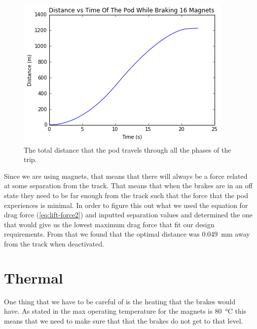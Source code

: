 \documentclass[main.tex]{subfiles}
\begin{document}
    \begin{figure}
        \centering
        \includegraphics[width=\linewidth]{images/totaldistanceprofile}
        \caption{The total distance that the pod travels through all the phases of the trip.}
        \label{fig:distance-profile}
    \end{figure}

    Since we are using magnets, that means that there will always be a force related at some separation from the track. That means that when the brakes are in an off state they need to be far enough from the track such that the force that the pod experiences is minimal. In order to figure this out what we used the equation for drag force (\ref{eq:lift-force2}) and inputted separation values and determined the one that would give us the lowest maximum drag force that fit our design requirements. From that we found that the optimal distance was \SI{0.049}{mm} away from the track when deactivated.

    \section{Thermal}
    One thing that we have to be careful of is the heating that the brakes would have. As stated in  the max operating temperature for the magnets is \SI{80}{\celsius} this means that we need to make sure that that the brakes do not get to that level.\\
\end{document}
